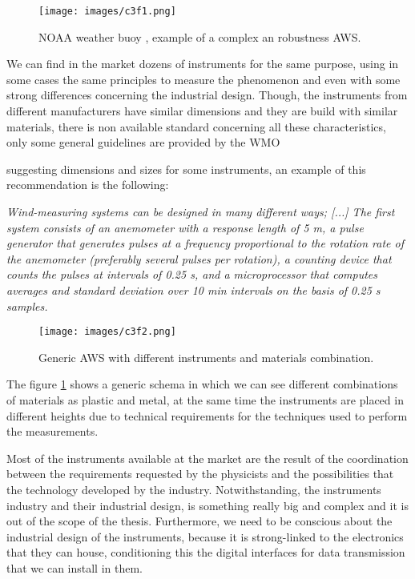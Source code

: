 \begin{figure}[H]
\centerline{\texttt{[image: images/c3f1.png]}}
\caption{\protect \gls{NOAA} weather buoy \protect \cite{NOAA}, example of a complex an robustness \protect \gls{AWS}.}
\end{figure}

We can find in the market dozens of instruments for the same purpose, using in some cases the same principles to measure the phenomenon and even with some strong differences concerning the industrial design. Though, the instruments from different manufacturers have similar dimensions and they are build with similar materials, there is non available standard concerning all these characteristics, only some general guidelines are provided by the \gls{WMO}{\cite{WMO} suggesting dimensions and sizes for some instruments, an example of this recommendation is the following:

\emph{Wind-measuring systems can be designed in many different ways; [...]
The first system consists of an anemometer with a response length of 5 m, a pulse generator that generates pulses at a frequency proportional to the rotation rate of the anemometer (preferably several pulses per rotation), a counting device that counts the pulses at intervals of 0.25 s, and a microprocessor that computes averages and standard deviation over 10 min intervals on the basis of 0.25 s samples.}\cite{GMIMO}

\begin{figure}[H]
\centerline{\texttt{[image: images/c3f2.png]}}
\caption{Generic \protect \gls{AWS} with different instruments and materials combination.}
\label{f3.2}
\end{figure}

The figure \ref{f3.2} shows a generic schema in which we can see different combinations of materials as plastic and metal, at the same time the instruments are placed in different heights due to technical requirements for the techniques used to perform the measurements. 

Most of the instruments available at the market are the result of the coordination between the requirements requested by the physicists and the possibilities that the technology developed by the industry. Notwithstanding, the instruments industry and their industrial design, is something really big and complex and it is out of the scope of the thesis. Furthermore, we need to be conscious about the industrial design of the instruments, because it is strong-linked to the electronics that they can house, conditioning this the digital interfaces for data transmission that we can install in them.

}
